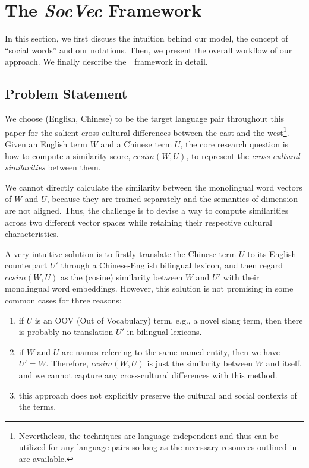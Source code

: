 \section{The \textit{SocVec} Framework}
\label{sec:socvec}
In this section, we first discuss the intuition behind our model, the concept of ``social words'' and our notations. Then, we present the overall workflow of our approach. We finally describe the~\textit{\socvec}~framework in detail.
\subsection{Problem Statement}
We choose (English, Chinese) to be the target language pair throughout this paper for the salient cross-cultural differences between the east and the west\footnote{Nevertheless, the techniques are language independent and 
thus can be utilized for any language pairs so long as 
the necessary resources outlined in  are available.}.
Given an English term $W$ and a Chinese term $U$,
the core research question is 
how to compute a similarity score, $ccsim(W, U)$, to represent the \textit{cross-cultural} \textit{similarities} between them. 

We cannot directly calculate 
the similarity between the monolingual word vectors of $W$ and $U$, 
because they are trained separately and the semantics of dimension
are not aligned.
Thus, the challenge is to devise a way to compute similarities across two different vector spaces while retaining 
their respective cultural characteristics. 

A very intuitive solution is to firstly translate the Chinese term $U$ to its English 
counterpart $U'$ through a Chinese-English bilingual lexicon, and then regard $ccsim(W, U)$ as 
the (cosine) similarity between $W$ and $U'$ with their monolingual word embeddings.
However, this solution is not promising in some common cases for three reasons: 
\begin{enumerate}[\hspace{0cm}(a)]
	\item if $U$ is an OOV (Out of Vocabulary) term, e.g., a novel slang term, 
	then there is probably no translation $U'$ in bilingual lexicons.
	\item if $W$ and $U$ are names referring to the same named entity, then we have $U' = W$. Therefore, $ccsim(W, U)$ is just the similarity between $W$ and itself, and we cannot capture any cross-cultural differences with this method.
	\item this approach does not explicitly preserve the 
	cultural and social contexts of the terms.
\end{enumerate}

